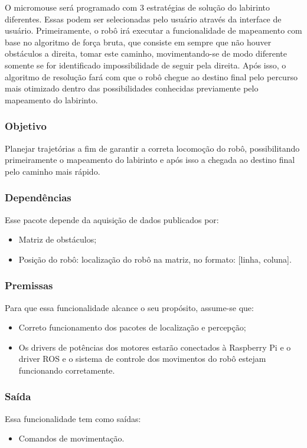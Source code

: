 O micromouse será programado com 3 estratégias de solução do labirinto diferentes. Essas podem ser selecionadas pelo usuário através da interface de usuário. Primeiramente, o robô irá executar a funcionalidade de mapeamento com base no algoritmo de força bruta, que consiste em sempre que não houver obstáculos a direita, tomar este caminho, movimentando-se de modo diferente somente se for identificado impossibilidade de seguir pela direita. Após isso, o algoritmo de resolução fará com que o robô chegue ao destino final pelo percurso mais otimizado dentro das possibilidades conhecidas previamente pelo mapeamento do labirinto.

\subsubsection{Objetivo}
Planejar trajetórias a fim de garantir a correta locomoção do robô, possibilitando primeiramente o mapeamento do labirinto e após isso a chegada ao destino final pelo caminho mais rápido.

\subsubsection{Dependências}
Esse pacote depende da aquisição de dados publicados por:
\begin{itemize}
	\item Matriz de obstáculos;
	\item Posição do robô: localização do robô na matriz, no formato: [linha, coluna].
\end{itemize}

\subsubsection{Premissas}
Para que essa funcionalidade alcance o seu propósito, assume-se que:
\begin{itemize}
	\item Correto funcionamento dos pacotes de localização e percepção;
	\item Os drivers de potências dos motores estarão conectados à Raspberry Pi e o driver ROS e o sistema de controle dos movimentos do robô estejam funcionando corretamente.
\end{itemize}

\subsubsection{Saída}
Essa funcionalidade tem como saídas:
\begin{itemize}
	\item Comandos de movimentação.
\end{itemize}

